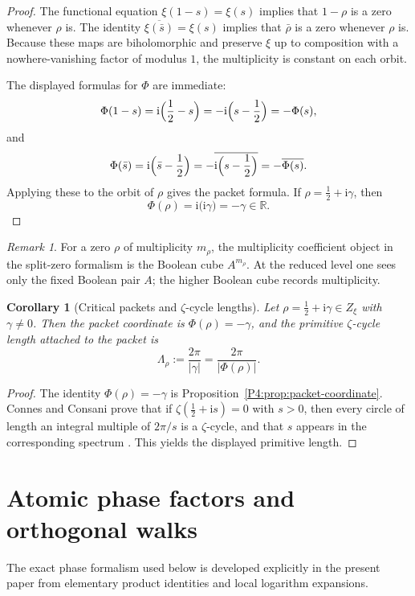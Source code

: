 \documentclass[11pt,a4paper]{article}
\numberwithin{equation}{section}
\newtheorem{corollary}[theorem]{Corollary}
\theoremstyle{definition}
\theoremstyle{remark}
\newtheorem{remark}[theorem]{Remark}
\newcommand{\RR}{\mathbb R}
\newcommand{\ii}{\mathrm i}
\begin{document}
\begin{proof}
The functional equation $\xi(1-s)=\xi(s)$ implies that $1-\rho$ is a zero whenever $\rho$ is.  The identity $\overline{\xi(\bar s)}=\xi(s)$ implies that $\bar\rho$ is a zero whenever $\rho$ is.  Because these maps are biholomorphic and preserve $\xi$ up to composition with a nowhere-vanishing factor of modulus $1$, the multiplicity is constant on each orbit.

The displayed formulas for $\Phi$ are immediate:
\[
\Phi(1-s)=\ii\Bigl(\frac12-s\Bigr)=-\ii\Bigl(s-\frac12\Bigr)=-\Phi(s),
\]
and
\[
\Phi(\bar s)=\ii\Bigl(\bar s-\frac12\Bigr)=-\overline{\ii\Bigl(s-\frac12\Bigr)}=-\overline{\Phi(s)}.
\]
Applying these to the orbit of $\rho$ gives the packet formula.  If $\rho=\tfrac12+\ii\gamma$, then
\[
\Phi(\rho)=\ii\bigl(\ii\gamma\bigr)=-\gamma\in\RR.
\]
\end{proof}

\begin{remark}
For a zero $\rho$ of multiplicity $m_\rho$, the multiplicity coefficient object in the split-zero formalism is the Boolean cube $A^{m_\rho}$.  At the reduced level one sees only the fixed Boolean pair $A$; the higher Boolean cube records multiplicity.
\end{remark}

\begin{corollary}[Critical packets and $\zeta$-cycle lengths]\label{P4:cor:critical-length}
Let $\rho=\tfrac12+\ii\gamma\in Z_\xi$ with $\gamma\neq0$.  Then the packet coordinate is $\Phi(\rho)=-\gamma$, and the primitive $\zeta$-cycle length attached to the packet is
\[
\Lambda_\rho:=\frac{2\pi}{|\gamma|}=\frac{2\pi}{|\Phi(\rho)|}.
\]
\end{corollary}

\begin{proof}
The identity $\Phi(\rho)=-\gamma$ is Proposition~\ref{P4:prop:packet-coordinate}.  Connes and Consani prove that if $\zeta(\tfrac12+\ii s)=0$ with $s>0$, then every circle of length an integral multiple of $2\pi/s$ is a $\zeta$-cycle, and that $s$ appears in the corresponding spectrum \cite[Theorem~1.1(ii)]{ConnesConsaniCycles}.  This yields the displayed primitive length.
\end{proof}

\section{Atomic phase factors and orthogonal walks}

The exact phase formalism used below is developed explicitly in the present paper from elementary product identities and local logarithm expansions.
\end{document}
